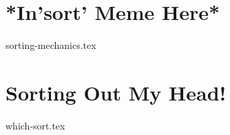 \documentclass[11pt]{exam}
\begin{document}
\pagebreak

\pagebreak
\section{*In'sort' Meme Here*}
\begin{questions}
{sorting-mechanics.tex}
\end{questions}

\section{Sorting Out My Head!}
\begin{questions}
{which-sort.tex}
\end{questions}

\pagebreak
\end{document}
